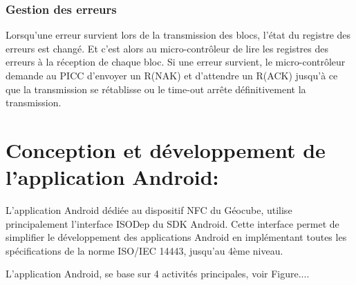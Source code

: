 \documentclass{themeensg}
\begin{document}
\subsubsection{Gestion des erreurs}
Lorsqu'une erreur survient lors de la transmission des blocs, l'état du registre des erreurs est changé. Et c'est alors au micro-contrôleur de lire les registres des erreurs à la réception de chaque bloc. Si une erreur survient, le micro-contrôleur demande au PICC d'envoyer un R(NAK) et d'attendre un R(ACK) jusqu'à ce que la transmission se rétablisse ou le time-out arrête définitivement la transmission.

\section{Conception et développement de l'application Android:}
L'application Android dédiée au dispositif NFC du Géocube, utilise principalement l'interface ISODep du SDK Android. Cette interface permet de simplifier le développement des applications Android en implémentant toutes les spécifications de la norme ISO/IEC 14443, jusqu'au 4ème niveau.

L'application Android, se base sur 4 activités principales, voir Figure....
\end{document}
